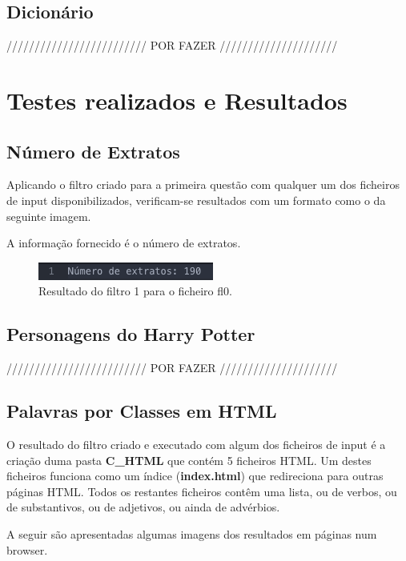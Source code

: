 \documentclass[11pt,a4paper]{report}
\begin{document}
\subsection{Dicionário}

///////////////////////// POR FAZER /////////////////////


\section{Testes realizados e Resultados}
\subsection{Número de Extratos}

Aplicando o filtro criado para a primeira questão com qualquer um dos ficheiros de input disponibilizados, verificam-se resultados com um formato como o da seguinte imagem.

A informação fornecido é o número de extratos.

\begin{figure}[H]
\centering
\includegraphics[scale=0.7]{testes1.png}
\caption{Resultado do filtro 1 para o ficheiro fl0.}
\label{img:testes1}
\end{figure}


\subsection{Personagens do Harry Potter}

///////////////////////// POR FAZER /////////////////////


\newpage

\subsection{Palavras por Classes em HTML}

O resultado do filtro criado e executado com algum dos ficheiros de input é a criação duma pasta \textbf{C\_HTML} que contém 5 ficheiros HTML. Um destes ficheiros funciona como um índice (\textbf{index.html}) que redireciona para outras páginas HTML. Todos os restantes ficheiros contêm uma lista, ou de verbos, ou de substantivos, ou de adjetivos, ou ainda de advérbios.

A seguir são apresentadas algumas imagens dos resultados em páginas num browser.
\end{document}

